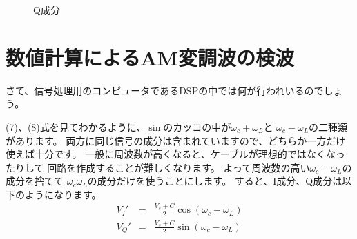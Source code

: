 \begin{figure}
\begin{minipage}{0.5\hsize}
\caption{Q成分}
\end{minipage}
\end{figure}

\section*{数値計算によるAM変調波の検波}
さて、信号処理用のコンピュータであるDSPの中では何が行われいるのでしょう。

(7)、(8)式を見てわかるように、$\sin$のカッコの中が$\omega_c+\omega_L$と
$\omega_c-\omega_L$の二種類があります。
両方に同じ信号の成分は含まれていますので、どちらか一方だけ使えば十分です。
一般に周波数が高くなると、ケーブルが理想的ではなくなったりして
回路を作成することが難しくなります。
よって周波数の高い$\omega_c + \omega_L$の成分を捨てて
$\omega_c \omega_L$の成分だけを使うことにします。
すると、I成分、Q成分は以下のようになります。
\begin{eqnarray}
V_I' &=& \frac{V_s+C}{2}\cos(\omega_c - \omega_L) \label{eq:AM_DSP_I}\\
V_Q' &=& \frac{V_s+C}{2}\sin(\omega_c - \omega_L) \label{eq:AM_DSP_Q}
\end{eqnarray}

